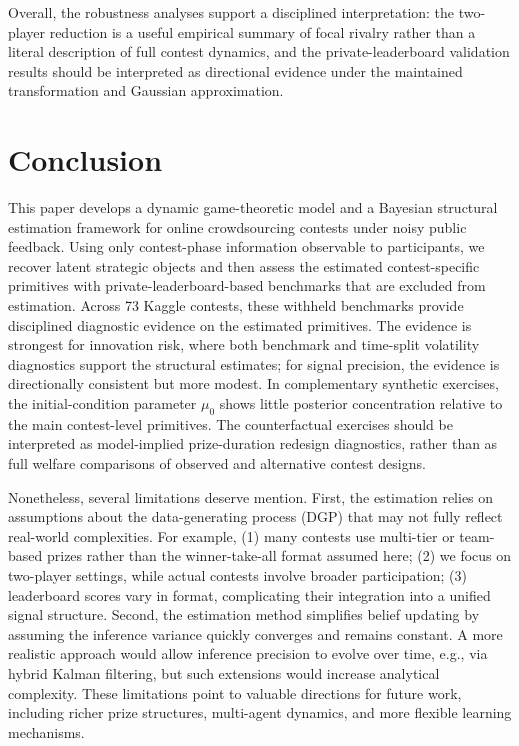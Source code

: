 \documentclass[mnsc]{informs3}
\begin{document}
Overall, the robustness analyses support a disciplined interpretation: the two-player reduction is a useful empirical summary of focal rivalry rather than a literal description of full contest dynamics, and the private-leaderboard validation results should be interpreted as directional evidence under the maintained transformation and Gaussian approximation.


\section{Conclusion}

This paper develops a dynamic game-theoretic model and a Bayesian structural estimation framework for online crowdsourcing contests under noisy public feedback.
Using only contest-phase information observable to participants, we recover latent strategic objects and then assess the estimated contest-specific primitives with private-leaderboard-based benchmarks that are excluded from estimation.
Across 73 Kaggle contests, these withheld benchmarks provide disciplined diagnostic evidence on the estimated primitives.
The evidence is strongest for innovation risk, where both benchmark and time-split volatility diagnostics support the structural estimates; for signal precision, the evidence is directionally consistent but more modest.
In complementary synthetic exercises, the initial-condition parameter $\mu_0$ shows little posterior concentration relative to the main contest-level primitives.
The counterfactual exercises should be interpreted as model-implied prize-duration redesign diagnostics, rather than as full welfare comparisons of observed and alternative contest designs.


Nonetheless, several limitations deserve mention.
First, the estimation relies on assumptions about the data-generating process (DGP) that may not fully reflect real-world complexities.
For example,
(1) many contests use multi-tier or team-based prizes rather than the winner-take-all format assumed here;
(2) we focus on two-player settings, while actual contests involve broader participation;
(3) leaderboard scores vary in format, complicating their integration into a unified signal structure.
Second, the estimation method simplifies belief updating by assuming the inference variance quickly converges and remains constant.
A more realistic approach would allow inference precision to evolve over time, e.g., via hybrid Kalman filtering, but such extensions would increase analytical complexity.
These limitations point to valuable directions for future work, including richer prize structures, multi-agent dynamics, and more flexible learning mechanisms.
\end{document}
